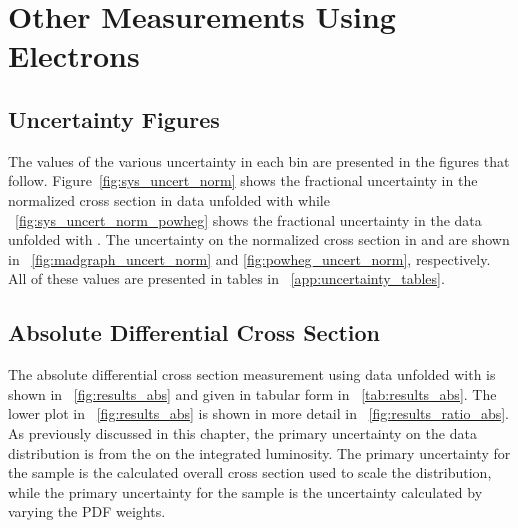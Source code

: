 \chapter{Other Measurements Using \Dressed Electrons}
\label{app:dressed_measurements}

\section{Uncertainty Figures}

The values of the various uncertainty in each \phistar bin are presented in the
figures that follow. Figure~\ref{fig:sys_uncert_norm} shows the fractional
uncertainty in the normalized \phistar cross section in data unfolded with
\MADGRAPH while \FIG~\ref{fig:sys_uncert_norm_powheg} shows the fractional
uncertainty in the data unfolded with \POWHEG. The uncertainty on the
normalized \phistar cross section in \MADGRAPH and \POWHEG are shown in
\FIGS~\ref{fig:madgraph_uncert_norm} and \ref{fig:powheg_uncert_norm},
respectively. All of these values are presented in tables in
\APP~\ref{app:uncertainty_tables}.











\section{Absolute Differential Cross Section}
\label{sec:results_abs}

The absolute differential cross section measurement using data unfolded with
\MADGRAPH is shown in \FIG~\ref{fig:results_abs} and given in tabular form in
\TAB~\ref{tab:results_abs}. The lower plot in \FIG~\ref{fig:results_abs} is
shown in more detail in \FIG~\ref{fig:results_ratio_abs}. As previously
discussed in this chapter, the primary uncertainty on the data distribution is
from the on the integrated luminosity. The primary uncertainty for the
\MADGRAPH sample is the \FEWZ calculated overall cross section used to scale
the distribution, while the primary uncertainty for the \POWHEG sample is the
uncertainty calculated by varying the \CTten PDF weights.


